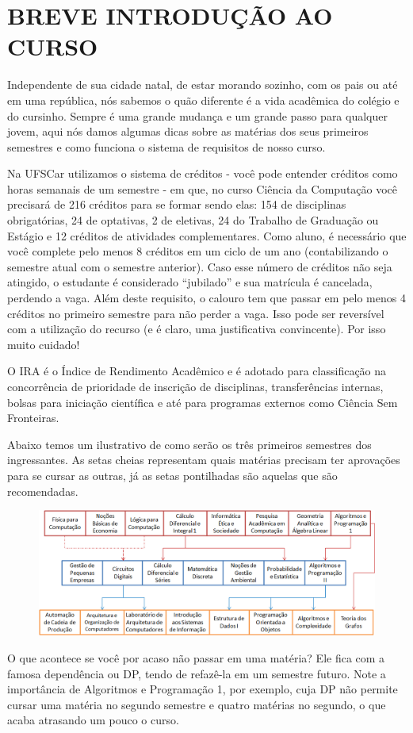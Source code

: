 \section{BREVE INTRODUÇÃO AO CURSO}
Independente de sua cidade natal, de estar morando sozinho, com os pais ou até em uma república, nós sabemos o quão diferente é a vida acadêmica do colégio e do cursinho. Sempre é uma grande mudança e um grande passo para qualquer jovem, aqui nós damos algumas dicas sobre as matérias dos seus primeiros semestres e como funciona o sistema de requisitos de nosso curso.

Na UFSCar utilizamos o sistema de créditos - você pode entender créditos como horas semanais de um semestre - em que, no curso Ciência da Computação você precisará de 216 créditos para se formar sendo elas: 154 de disciplinas obrigatórias, 24 de optativas, 2 de eletivas, 24 do Trabalho de Graduação ou Estágio e 12 créditos de atividades complementares. Como aluno, é necessário que você complete pelo menos 8 créditos em um ciclo de um ano (contabilizando o semestre atual com o semestre anterior). Caso esse número de créditos não seja atingido, o estudante é considerado “jubilado” e sua matrícula é cancelada, perdendo a vaga. Além deste requisito, o calouro tem que passar em pelo menos 4 créditos no primeiro semestre para não perder a vaga. Isso pode ser reversível com a utilização do recurso (e é claro, uma justificativa convincente). Por isso muito cuidado!

O IRA é o Índice de Rendimento Acadêmico e é adotado para classificação na concorrência de prioridade de inscrição de disciplinas, transferências internas, bolsas para iniciação científica e até para programas externos como Ciência Sem Fronteiras. 

Abaixo temos um ilustrativo de como serão os três primeiros semestres dos ingressantes. As setas cheias representam quais matérias precisam ter aprovações para se cursar as outras, já as setas pontilhadas são aquelas que são recomendadas.

\begin{figure}[h]
    \centering
    \includegraphics[width=\textwidth]{./imagem/requisitos_materias.png}
\end{figure}

O que acontece se você por acaso não passar em uma matéria? Ele fica com a famosa dependência ou DP, tendo de refazê-la em um semestre futuro. Note a importância de Algoritmos e Programação 1, por exemplo, cuja DP não permite cursar uma matéria no segundo semestre e quatro matérias no segundo, o que acaba atrasando um pouco o curso.
